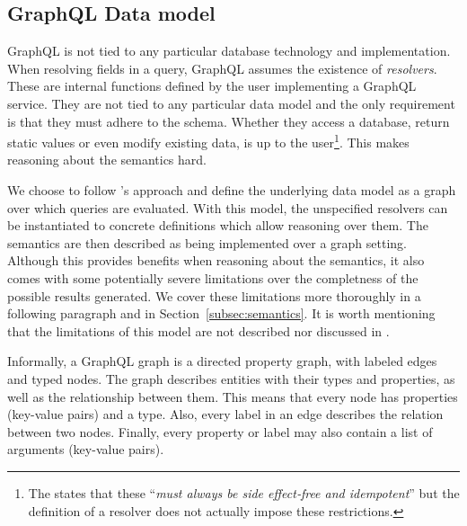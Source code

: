 \subsection{GraphQL Data model}\label{subsec:graph}

GraphQL is not tied to any particular database technology and implementation. When resolving fields in a query, GraphQL assumes the existence of \textit{resolvers}. These are internal functions defined by the user implementing a GraphQL service. They are not tied to any particular data model and the only requirement is that they must adhere to the schema. Whether they access a database, return static values or even modify existing data, is up to the user\footnote{The \spec{} states that these ``\textit{must always be side effect‐free and idempotent}'' but the definition of a resolver does not actually impose these restrictions.}. This makes reasoning about the semantics hard.

We choose to follow \HP{}'s approach and define the underlying data model as a graph over which queries are evaluated. With this model, the unspecified resolvers can be instantiated to concrete definitions which allow reasoning over them. The semantics are then described as being implemented over a graph setting. Although this provides benefits when reasoning about the semantics, it also comes with some potentially severe limitations over the completness of the possible results generated. We cover these limitations more thoroughly in a following paragraph and in Section~\ref{subsec:semantics}. It is worth mentioning that the limitations of this model are not described nor discussed in \HP{}.

Informally, a GraphQL graph is a directed property graph, with labeled edges and typed nodes. The graph describes entities with their types and properties, as well as the relationship between them. This means that every node has properties (key-value pairs) and a type. Also, every label in an edge describes the relation between two nodes. Finally, every property or label may also contain a list of arguments (key-value pairs).

